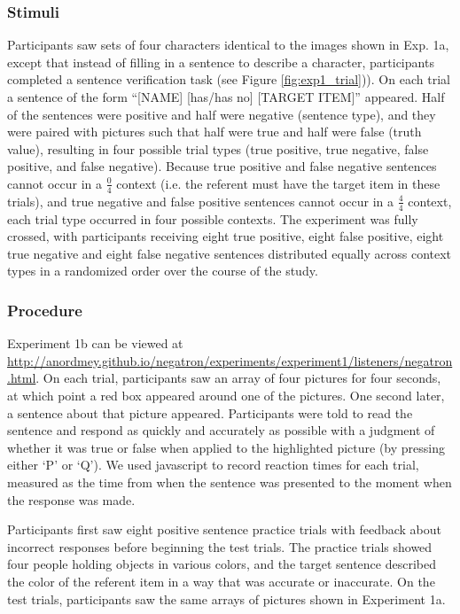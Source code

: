 \documentclass[man, floatsintext, noapacite]{apa6}
\begin{document}
\subsubsection{Stimuli}

Participants saw sets of four characters identical to the images shown in Exp. 1a, except that instead of filling in a sentence to describe a character, participants completed a sentence verification task (see Figure \ref{fig:exp1_trial})). On each trial a sentence of the form ``[NAME] [has/has no] [TARGET ITEM]'' appeared.  Half of the sentences were positive and half were negative (sentence type), and they were paired with pictures such that half were true and half were false (truth value), resulting in four possible trial types (true positive, true negative, false positive, and false negative).  Because true positive and false negative sentences cannot occur in a $\frac{0}{4}$ context (i.e. the referent must have the target item in these trials), and true negative and false positive sentences cannot occur in a $\frac{4}{4}$ context, each trial type occurred in four possible contexts.  The experiment was fully crossed, with participants receiving eight true positive, eight false positive, eight true negative and eight false negative sentences distributed equally across context types in a randomized order over the course of the study.  

\subsubsection{Procedure}

Experiment 1b can be viewed at \url{http://anordmey.github.io/negatron/experiments/experiment1/listeners/negatron.html}. On each trial, participants saw an array of four pictures for four seconds, at which point a red box appeared around one of the pictures. One second later, a sentence about that picture appeared. Participants were told to read the sentence and respond as quickly and accurately as possible with a judgment of whether it was true or false when applied to the highlighted picture (by pressing either `P' or `Q').  We used javascript to record reaction times for each trial, measured as the time from when the sentence was presented to the moment when the response was made.

Participants first saw eight positive sentence practice trials with feedback about incorrect responses before beginning the test trials. The practice trials showed four people holding objects in various colors, and the target sentence described the color of the referent item in a way that was accurate or inaccurate. On the test trials, participants saw the same arrays of pictures shown in Experiment 1a. 
\end{document}
